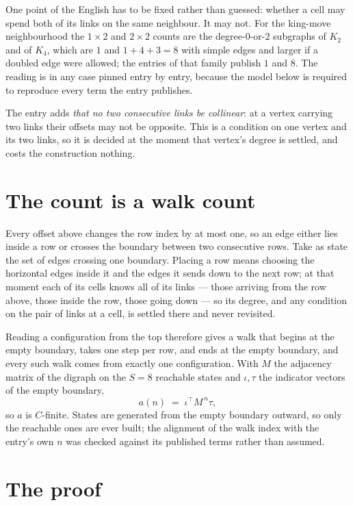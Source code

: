 \documentclass[11pt,a4paper]{article}
\theoremstyle{plain}
\theoremstyle{definition}
\begin{document}
One point of the English has to be fixed rather than guessed: whether a cell may spend both of
its links on the same neighbour. It may not. For the king-move neighbourhood the $1\times2$
and $2\times2$ counts are the degree-$0$-or-$2$ subgraphs of $K_2$ and of $K_4$, which are $1$
and $1+4+3=8$ with simple edges and larger if a doubled edge were allowed; the entries of that
family publish $1$ and $8$. The reading is in any case pinned entry by entry, because the
model below is required to reproduce every term the entry publishes.

The entry adds \emph{that no two consecutive links be collinear}: at a vertex carrying two
links their offsets may not be opposite. This is a condition on one vertex and its two links,
so it is decided at the moment that vertex's degree is settled, and costs the construction
nothing.

\section{The count is a walk count}

Every offset above changes the row index by at most one, so an edge either lies inside a row
or crosses the boundary between two consecutive rows. Take as state the set of edges crossing
one boundary. Placing a row means choosing the horizontal edges inside it and the edges it
sends down to the next row; at that moment each of its cells knows all of its links --- those
arriving from the row above, those inside the row, those going down --- so its degree, and any
condition on the pair of links at a cell, is settled there and never revisited.

Reading a configuration from the top therefore gives a walk that begins at the empty boundary,
takes one step per row, and ends at the empty boundary, and every such walk comes from exactly
one configuration. With $M$ the adjacency matrix of the digraph on the $S=8$ reachable
states and $\iota,\tau$ the indicator vectors of the empty boundary,
\[
a(n)\;=\;\iota^{\!\top}M^{\,n}\tau ,
\]
so $a$ is $C$-finite. States are generated from the empty boundary outward, so only the
reachable ones are ever built; the alignment of the walk index with the entry's own $n$ was
checked against its published terms rather than assumed.

\section{The proof}
\end{document}
